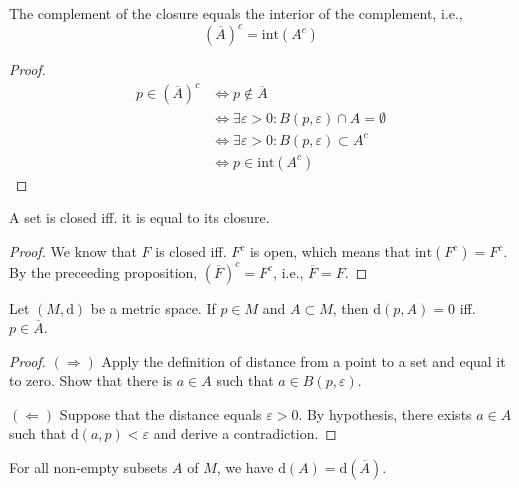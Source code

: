 \begin{proposition}
    The complement of the closure equals the interior of the complement, i.e.,
    \[
        (\overline{A})^c = \text{int}(A^c)
    \]
\end{proposition}

\begin{proof}
    \begin{equation*}
        \begin{aligned}
            p \in (\overline{A})^c &\iff p \notin \overline{A} \\
            &\iff \exists \varepsilon > 0 : B(p, \varepsilon) \cap A = \emptyset \\
            &\iff \exists \varepsilon > 0: B(p, \varepsilon) \subset A^c \\
            &\iff p \in \text{int}(A^c)
        \end{aligned}
    \end{equation*}
\end{proof}

\begin{corollary}
    A set is closed iff. it is equal to its closure.
\end{corollary}

\begin{proof}
    We know that $F$ is closed iff. $F^c$ is open, which means that $\text{int}(F^c) = F^c$. By the preceeding proposition, $(\overline{F})^c = F^c$, i.e., $\overline{F} = F$.
\end{proof}

\begin{proposition}
    Let $(M, \mathrm{d})$ be a metric space. If $p \in M$ and $A \subset M$, then $\mathrm{d}(p, A) = 0$ iff. $p \in \overline{A}$.
\end{proposition}

\begin{proof}
    $(\Rightarrow)$ Apply the definition of distance from a point to a set and equal it to zero. Show that there is $a \in A$ such that $a \in B(p, \varepsilon)$.

    $(\Leftarrow)$ Suppose that the distance equals $\varepsilon > 0$. By hypothesis, there exists $a \in A$ such that $\mathrm{d}(a, p) < \varepsilon$ and derive a contradiction.
\end{proof}

\begin{proposition}
    For all non-empty subsets $A$ of $M$, we have $\mathrm{d}(A) = \mathrm{d}(\overline{A})$.
\end{proposition}

